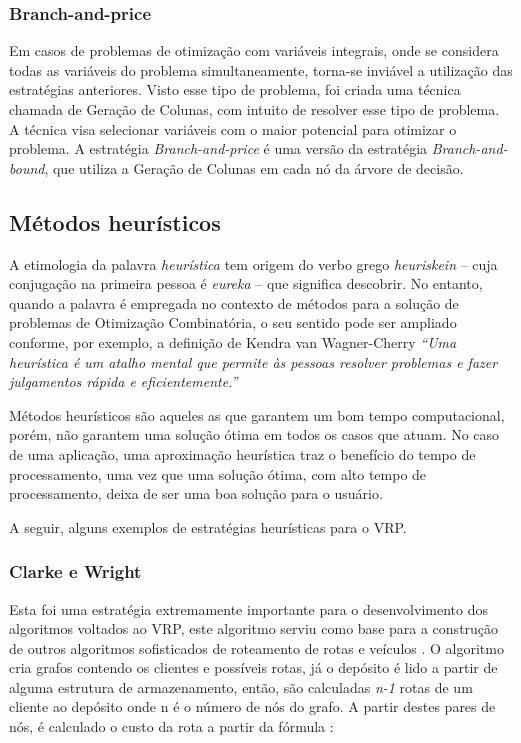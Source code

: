 \subsubsection{Branch-and-price}
Em casos de problemas de otimização com variáveis integrais, onde se considera todas as variáveis do problema simultaneamente, torna-se inviável a utilização das estratégias anteriores. Visto esse tipo de problema, foi criada uma técnica chamada de Geração de Colunas, com intuito de resolver esse tipo de problema. A técnica visa selecionar variáveis com o maior potencial para otimizar o problema. A estratégia \emph{Branch-and-price} é uma versão da estratégia \emph{Branch-and-bound}, que utiliza a Geração de Colunas  em cada nó da árvore de decisão.

\subsection{Métodos heurísticos}\label{heuristica}
A etimologia da palavra \emph{heurística} tem origem do verbo grego \emph{heuriskein} -- cuja conjugação na primeira pessoa é \emph{eureka} -- que significa descobrir. No entanto, quando a palavra é empregada no contexto de métodos para a solução de problemas de Otimização Combinatória, o seu sentido pode ser ampliado conforme, por exemplo, a definição de Kendra van Wagner-Cherry \emph{``Uma heurística é um atalho mental que permite às pessoas resolver problemas e fazer julgamentos rápida e eficientemente.''} \cite{goldbarg}


Métodos heurísticos são aqueles as que garantem um bom tempo computacional, porém, não garantem uma solução ótima em todos os casos que atuam. No caso de uma aplicação, uma aproximação heurística traz o benefício do tempo de processamento, uma vez que uma solução ótima, com alto tempo de processamento, deixa de ser uma boa solução para o usuário. 

A seguir, alguns exemplos de estratégias heurísticas para o VRP.

\subsubsection{Clarke e Wright}

Esta foi uma estratégia extremamente importante para o desenvolvimento dos algoritmos voltados ao VRP, este algoritmo serviu como base para a construção de outros algoritmos sofisticados de roteamento de rotas e veículos \cite{milton-nascimento}. O algoritmo cria grafos contendo os clientes e possíveis rotas, já o depósito é lido a partir de alguma estrutura de armazenamento, então, são calculadas \emph{n-1} rotas de um cliente ao depósito onde n é o número de nós do grafo. A partir destes pares de nós, é calculado  o custo da rota a partir da fórmula \cite[p. 32]{maxwell}: 

